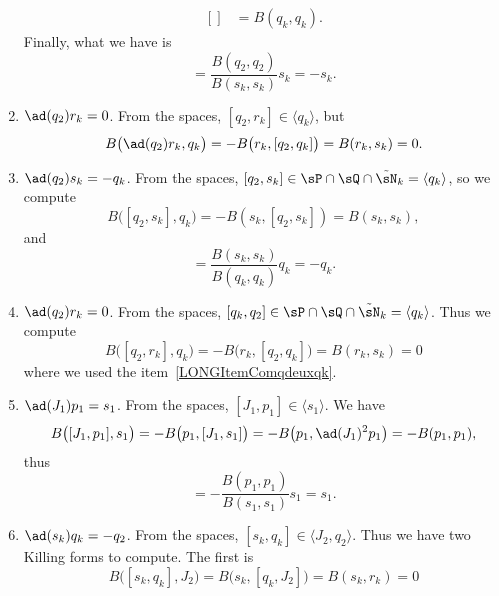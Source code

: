 \begin{enumerate}
\begin{equation}
\begin{aligned}[]
			                                 & =B(q_k,q_k).
		      \end{aligned}
	      \end{equation}
	      Finally, what we have is
	      \begin{equation}
		      [q_2,q_k]=\frac{ B(q_2,q_2) }{ B(s_k,s_k) }s_k=-s_k.
	      \end{equation}
	\item$\ad(q_2)r_k=0$. From the spaces, $[q_2,r_k]\in\langle q_k\rangle$, but
	      \begin{equation}
		      B\big( \ad(q_2)r_k,q_k \big)=-B\big( r_k,[q_2,q_k] \big)=B(r_k,s_k)=0.
	      \end{equation}
	\item$\ad(q_2)s_k=-q_k$. From the spaces, $[q_2,s_k]\in\sP\cap\sQ\cap\tilde\sN_k=\langle q_k\rangle$, so we compute
	      \begin{equation}
		      B\big( [q_2,s_k],q_k \big)=-B(s_k,[q_2,s_k])=B(s_k,s_k),
	      \end{equation}
	      and
	      \begin{equation}
		      [q_2,s_k]=\frac{ B(s_k,s_k) }{ B(q_k,q_k) }q_k=-q_k.
	      \end{equation}
	\item$\ad(q_2)r_k=0$. From the spaces, $[q_k,q_2]\in\sP\cap\sQ\cap\tilde\sN_k=\langle q_k\rangle$. Thus we compute
	      \begin{equation}
		      B\big( [q_2,r_k],q_k \big)=-B\big( r_k,[q_2,q_k] \big)=B(r_k,s_k)=0
	      \end{equation}
	      where we used the item~\ref{LONGItemComqdeuxqk}.
	\item\label{LONGItemComjunpun}$\ad(J_1)p_1=s_1$. From the spaces, $[J_1,p_1]\in\langle s_1\rangle$. We have
	      \begin{equation}
		      B\big( [J_1,p_1],s_1 \big)=-B\big( p_1,[J_1,s_1] \big)=-B\big( p_1,\ad(J_1)^2p_1 \big)=-B(p_1,p_1),
	      \end{equation}
	      thus
	      \begin{equation}
		      [J_1,p_1]=-\frac{ B(p_1,p_1) }{ B(s_1,s_1) }s_1=s_1.
	      \end{equation}
	\item\label{LONGItemComskqk}$\ad(s_k)q_k=-q_2$. From the spaces, $[s_k,q_k]\in\langle J_2,q_2\rangle$. Thus we have two Killing forms to compute. The first is
	      \begin{equation}
		      B\big( [s_k,q_k],J_2 \big)=B\big( s_k,[q_k,J_2] \big)=B(s_k,r_k)=0
	      \end{equation}

\end{enumerate}
